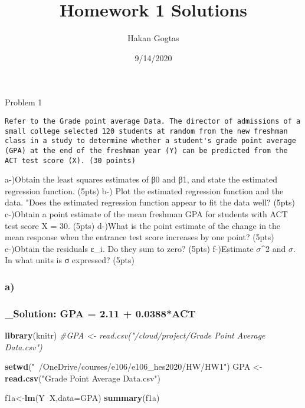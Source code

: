 \documentclass[
]{article}
\title{Homework 1 Solutions}
\author{Hakan Gogtas}
\date{9/14/2020}
\newenvironment{Shaded}{\begin{snugshade}}{\end{snugshade}}
\newcommand{\CommentTok}[1]{\textcolor[rgb]{0.56,0.35,0.01}{\textit{#1}}}
\newcommand{\DataTypeTok}[1]{\textcolor[rgb]{0.13,0.29,0.53}{#1}}
\newcommand{\KeywordTok}[1]{\textcolor[rgb]{0.13,0.29,0.53}{\textbf{#1}}}
\newcommand{\NormalTok}[1]{#1}
\newcommand{\OperatorTok}[1]{\textcolor[rgb]{0.81,0.36,0.00}{\textbf{#1}}}
\newcommand{\StringTok}[1]{\textcolor[rgb]{0.31,0.60,0.02}{#1}}
\begin{document}
\maketitle

Problem 1

\begin{verbatim}
Refer to the Grade point average Data. The director of admissions of a small college selected 120 students at random from the new freshman class in a study to determine whether a student's grade point average (GPA) at the end of the freshman year (Y) can be predicted from the ACT test score (X). (30 points)
\end{verbatim}

a-)Obtain the least squares estimates of β0 and β1, and state the
estimated regression function. (5pts) b-) Plot the estimated regression
function and the data. "Does the estimated regression function appear to
fit the data well? (5pts) c-)Obtain a point estimate of the mean
freshman GPA for students with ACT test score X = 30. (5pts) d-)What is
the point estimate of the change in the mean response when the entrance
test score increases by one point? (5pts) e-)Obtain the residuals ε\_i.
Do they sum to zero? (5pts) f-)Estimate \(\sigma\)\^{}2 and \(\sigma\).
In what units is σ expressed? (5pts)

\hypertarget{a}{%
\subsubsection{a)}\label{a}}

\hypertarget{solution-gpa-2.11-0.0388act}{%
\subsubsection{\_Solution: GPA = 2.11 +
0.0388*ACT}\label{solution-gpa-2.11-0.0388act}}

\begin{Shaded}
\begin{Highlighting}[]
\KeywordTok{library}\NormalTok{(knitr)}
\CommentTok{#GPA <- read.csv("/cloud/project/Grade Point Average Data.csv")}

\KeywordTok{setwd}\NormalTok{(}\StringTok{"~/OneDrive/courses/e106/e106_hes2020/HW/HW1"}\NormalTok{)}
\NormalTok{GPA <-}\StringTok{ }\KeywordTok{read.csv}\NormalTok{(}\StringTok{"Grade Point Average Data.csv"}\NormalTok{)}

\NormalTok{f1a<-}\KeywordTok{lm}\NormalTok{(Y}\OperatorTok{~}\NormalTok{X,}\DataTypeTok{data=}\NormalTok{GPA)}
\KeywordTok{summary}\NormalTok{(f1a)}
\end{Highlighting}
\end{Shaded}
\end{document}
